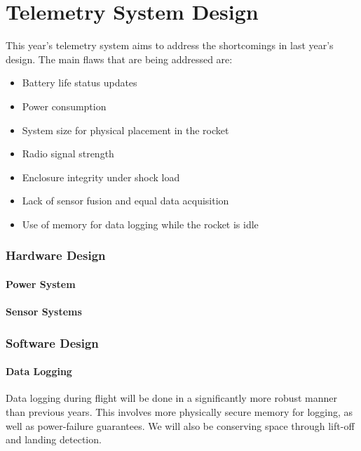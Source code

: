 \part{Telemetry System Design}
This year's telemetry system aims to address the shortcomings in last year's design. The main flaws that are being
addressed are:

\begin{itemize}
    \item Battery life status updates
    \item Power consumption
    \item System size for physical placement in the rocket
    \item Radio signal strength
    \item Enclosure integrity under shock load
    \item Lack of sensor fusion and equal data acquisition
    \item Use of memory for data logging while the rocket is idle
\end{itemize}

\section{Hardware Design}

\subsection{Power System}

\subsection{Sensor Systems}


\section{Software Design}
\subsection{Data Logging}

Data logging during flight will be done in a significantly more robust manner than previous years. This involves more physically secure memory for logging, as well as power-failure guarantees. We will also be conserving space through lift-off and landing detection.

